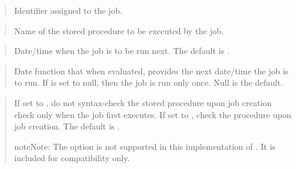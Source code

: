 \documentclass[letterpaper,10pt,english,openany,oneside]{sphinxmanual}
\begin{document}



\begin{quote}

Identifier assigned to the job.
\end{quote}

\begin{quote}

Name of the stored procedure to be executed by the job.
\end{quote}

\begin{quote}

Date/time when the job is to be run next. The default is .
\end{quote}

\begin{quote}

Date function that when evaluated, provides the next date/time the job
is to run. If  is set to null, then the job is run only once.
Null is the default.
\end{quote}

\begin{quote}

If set to , do not syntax-check the stored procedure upon job
creation \textendash{} check only when the job first executes. If set to ,
check the procedure upon job creation. The default is .

\begin{sphinxadmonition}{note}{Note:}
The  option is not supported in this implementation of . It is included for compatibility only.
\end{sphinxadmonition}
\end{quote}

\end{document}
